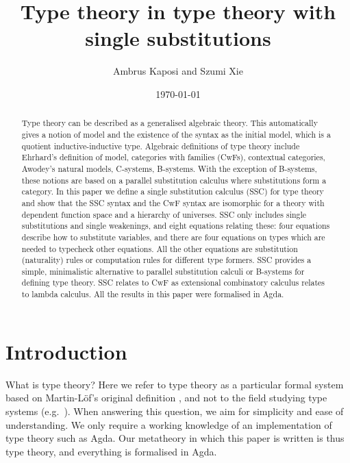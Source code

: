 \documentclass[sigplan,10pt,anonymous,review]{acmart}\settopmatter{printfolios=true,printccs=false,printacmref=false}
\begin{document}
\title{Type theory in type theory with single substitutions}
\author{Ambrus Kaposi and Szumi Xie}
\date{\today}

\begin{abstract}
Type theory can be described as a generalised algebraic theory. This
automatically gives a notion of model and the existence of the syntax
as the initial model, which is a quotient inductive-inductive
type. Algebraic definitions of type theory include Ehrhard's
definition of model, categories with families (CwFs), contextual
categories, Awodey's natural models, C-systems, B-systems. With the
exception of B-systems, these notions are based on a parallel
substitution calculus where substitutions form a category. In this
paper we define a single substitution calculus (SSC) for type theory
and show that the SSC syntax and the CwF syntax are isomorphic for a
theory with dependent function space and a hierarchy of universes. SSC
only includes single substitutions and single weakenings, and eight
equations relating these: four equations describe how to substitute
variables, and there are four equations on types which are needed to
typecheck other equations. All the other equations are substitution
(naturality) rules or computation rules for different type
formers. SSC provides a simple, minimalistic alternative to parallel
substitution calculi or B-systems for defining type theory. SSC
relates to CwF as extensional combinatory calculus relates to lambda
calculus. All the results in this paper were formalised in Agda.
\end{abstract}

\maketitle

\section{Introduction}

What is type theory? Here we refer to type theory as a particular
formal system based on Martin-Löf's original definition
\cite{martinlof73predicative}, and not to the field studying type
systems (e.g.\ \cite{DBLP:books/daglib/0005958}). When
answering this question, we aim for simplicity and ease of
understanding. We only require a working knowledge of an
implementation of type theory such as Agda. Our metatheory in which
this paper is written is thus type theory, and everything is
formalised in Agda.
\end{document}
